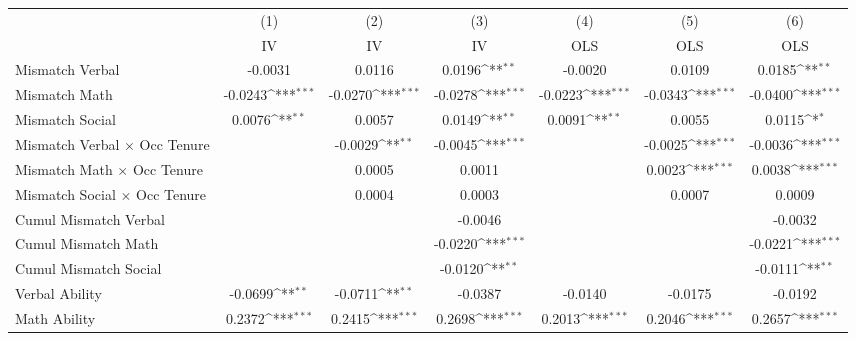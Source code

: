 {
\def\sym#1{\ifmmode^{#1}\else\(^{#1}\)\fi}
\begin{tabular}{l*{6}{c}}
\hline  
                    &\multicolumn{1}{c}{(1)}&\multicolumn{1}{c}{(2)}&\multicolumn{1}{c}{(3)}&\multicolumn{1}{c}{(4)}&\multicolumn{1}{c}{(5)}&\multicolumn{1}{c}{(6)}\\
                    &\multicolumn{1}{c}{IV}&\multicolumn{1}{c}{IV}&\multicolumn{1}{c}{IV}&\multicolumn{1}{c}{OLS}&\multicolumn{1}{c}{OLS}&\multicolumn{1}{c}{OLS}\\
\hline  
Mismatch Verbal     &     -0.0031         &      0.0116         &      0.0196\sym{**} &     -0.0020         &      0.0109         &      0.0185\sym{**} \\
[1em]
Mismatch Math       &     -0.0243\sym{***}&     -0.0270\sym{***}&     -0.0278\sym{***}&     -0.0223\sym{***}&     -0.0343\sym{***}&     -0.0400\sym{***}\\
[1em]
Mismatch Social     &      0.0076\sym{**} &      0.0057         &      0.0149\sym{**} &      0.0091\sym{**} &      0.0055         &      0.0115\sym{*}  \\
[1em]
Mismatch Verbal $\times$ Occ Tenure&                     &     -0.0029\sym{**} &     -0.0045\sym{***}&                     &     -0.0025\sym{***}&     -0.0036\sym{***}\\
[1em]
Mismatch Math $\times$ Occ Tenure&                     &      0.0005         &      0.0011         &                     &      0.0023\sym{***}&      0.0038\sym{***}\\
[1em]
Mismatch Social $\times$ Occ Tenure&                     &      0.0004         &      0.0003         &                     &      0.0007         &      0.0009         \\
[1em]
Cumul Mismatch Verbal&                     &                     &     -0.0046         &                     &                     &     -0.0032         \\
[1em]
Cumul Mismatch Math &                     &                     &     -0.0220\sym{***}&                     &                     &     -0.0221\sym{***}\\
[1em]
Cumul Mismatch Social&                     &                     &     -0.0120\sym{**} &                     &                     &     -0.0111\sym{**} \\
[1em]
Verbal Ability      &     -0.0699\sym{**} &     -0.0711\sym{**} &     -0.0387         &     -0.0140         &     -0.0175         &     -0.0192         \\
[1em]
Math Ability        &      0.2372\sym{***}&      0.2415\sym{***}&      0.2698\sym{***}&      0.2013\sym{***}&      0.2046\sym{***}&      0.2657\sym{***}\\

\end{tabular}}
